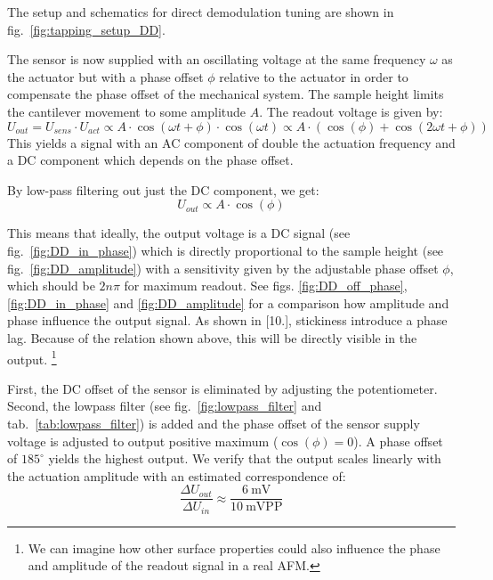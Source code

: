 \documentclass[a4paper,twoside,11pt,DIV=13,BCOR=5mm,numbers=noenddot]{scrbook}
\begin{document}

The setup and schematics for direct demodulation tuning are shown in fig.~\ref{fig:tapping_setup_DD}.

The sensor is now supplied with an oscillating voltage at the same frequency $\omega$ as the actuator but with a phase offset $\phi$ relative to the actuator in order to compensate 
the phase offset of the mechanical system. The sample height limits the cantilever movement to some amplitude $A$.
The readout voltage is given by:
$$U_{out} = U_{sens} \cdot U_{act} \propto A \cdot \cos(\omega t + \phi) \cdot \cos(\omega t) \propto A \cdot ( \cos(\phi) + \cos(2\omega t + \phi) )$$
This yields a signal with an AC component of double the actuation frequency and a DC component which depends on the phase offset.

By low-pass filtering out just the DC component, we get:
$$U_{out} \propto A \cdot \cos(\phi)$$

This means that ideally, the output voltage is a DC signal (see fig.~\ref{fig:DD_in_phase}) which is directly proportional to the sample height 
(see fig.~\ref{fig:DD_amplitude}) with a sensitivity given by the adjustable phase offset $\phi$, which should be $2n\pi$ for maximum readout. See figs. \ref{fig:DD_off_phase}, \ref{fig:DD_in_phase} and \ref{fig:DD_amplitude}
for a comparison how amplitude and phase influence the output signal.
As shown in [10.], stickiness introduce a phase lag. Because of the relation shown above, this will be directly visible in the output.
\footnote{We can imagine how other surface properties could also influence the phase and amplitude of the readout signal in a real AFM.}


First, the DC offset of the sensor is eliminated by adjusting the potentiometer.
Second, the lowpass filter (see fig.~\ref{fig:lowpass_filter} and tab.~\ref{tab:lowpass_filter}) is added and the phase offset of the sensor supply voltage is adjusted to output positive maximum ($\cos(\phi)=0$).
A phase offset of $185^{\circ}$ yields the highest output. We verify that the output scales linearly with the actuation amplitude with an estimated correspondence of:
$$\frac{\Delta U_{out}}{\Delta U_{in}} \approx \frac{\qty{6}{\mV}}{\qty{10}{\mV}\text{PP}}$$
\end{document}

